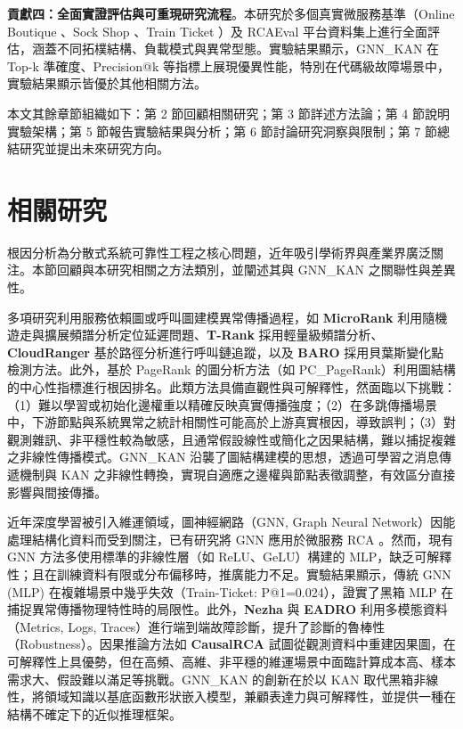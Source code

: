 \documentclass[10pt,a4paper,twocolumn]{article}
\begin{document}
\textbf{貢獻四：全面實證評估與可重現研究流程}。本研究於多個真實微服務基準（Online Boutique \cite{online_boutique}、Sock Shop \cite{sock_shop}、Train Ticket \cite{train_ticket}）及 RCAEval 平台資料集上進行全面評估，涵蓋不同拓樸結構、負載模式與異常型態。實驗結果顯示，GNN\_KAN 在 Top-k 準確度、Precision@k 等指標上展現優異性能，特別在代碼級故障場景中，實驗結果顯示皆優於其他相關方法。

本文其餘章節組織如下：第 2 節回顧相關研究；第 3 節詳述方法論；第 4 節說明實驗架構；第 5 節報告實驗結果與分析；第 6 節討論研究洞察與限制；第 7 節總結研究並提出未來研究方向。

\section{相關研究}

根因分析為分散式系統可靠性工程之核心問題，近年吸引學術界與產業界廣泛關注。本節回顧與本研究相關之方法類別，並闡述其與 GNN\_KAN 之關聯性與差異性。

多項研究利用服務依賴圖或呼叫圖建模異常傳播過程，如 \textbf{MicroRank} \cite{microrank2021} 利用隨機遊走與擴展頻譜分析定位延遲問題、\textbf{T-Rank} \cite{trank2021} 採用輕量級頻譜分析、\textbf{CloudRanger} \cite{cloudranger2018} 基於路徑分析進行呼叫鏈追蹤，以及 \textbf{BARO} \cite{baro2023} 採用貝葉斯變化點檢測方法。此外，基於 PageRank 的圖分析方法（如 PC\_PageRank）利用圖結構的中心性指標進行根因排名。此類方法具備直觀性與可解釋性，然面臨以下挑戰：（1）難以學習或初始化邊權重以精確反映真實傳播強度；（2）在多跳傳播場景中，下游節點與系統異常之統計相關性可能高於上游真實根因，導致誤判；（3）對觀測雜訊、非平穩性較為敏感，且通常假設線性或簡化之因果結構，難以捕捉複雜之非線性傳播模式。GNN\_KAN 沿襲了圖結構建模的思想，透過可學習之消息傳遞機制與 KAN 之非線性轉換，實現自適應之邊權與節點表徵調整，有效區分直接影響與間接傳播。

近年深度學習被引入維運領域，圖神經網路（GNN, Graph Neural Network）因能處理結構化資料而受到關注，已有研究將 GNN 應用於微服務 RCA \cite{gnn_rca2023}。然而，現有 GNN 方法多使用標準的非線性層（如 ReLU、GeLU）構建的 MLP，缺乏可解釋性；且在訓練資料有限或分布偏移時，推廣能力不足。實驗結果顯示，傳統 GNN (MLP) 在複雜場景中幾乎失效（Train-Ticket: P@1=0.024），證實了黑箱 MLP 在捕捉異常傳播物理特性時的局限性。此外，\textbf{Nezha} \cite{nezha2023} 與 \textbf{EADRO} \cite{eadro2023} 利用多模態資料（Metrics, Logs, Traces）進行端到端故障診斷，提升了診斷的魯棒性（Robustness）。因果推論方法如 \textbf{CausalRCA} \cite{causalrca2023} 試圖從觀測資料中重建因果圖，在可解釋性上具優勢，但在高頻、高維、非平穩的維運場景中面臨計算成本高、樣本需求大、假設難以滿足等挑戰。GNN\_KAN 的創新在於以 KAN 取代黑箱非線性，將領域知識以基底函數形狀嵌入模型，兼顧表達力與可解釋性，並提供一種在結構不確定下的近似推理框架。
\end{document}
